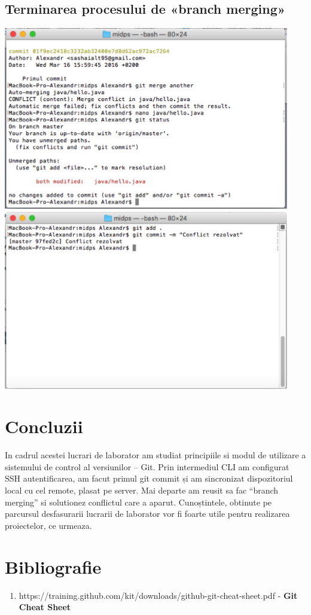 \documentclass[12pt]{article}
\begin{document}
\subsection{Terminarea procesului de «branch merging»}
\includegraphics[width=12.5cm]{images/26}\\
\includegraphics[width=12.5cm]{images/27}
\section*{Concluzii}
In cadrul acestei lucrari de laborator am studiat principiile si modul de utilizare a sistemului de control al versiunilor – Git. Prin intermediul CLI am configurat SSH autentificarea, am facut primul git commit și am sincronizat dispozitoriul local cu cel remote, plasat pe server. Mai departe am reusit sa fac “branch merging” si solutionez conflictul care a aparut. Cunoștintele, obtinute pe parcursul desfasurarii lucrarii de laborator vor fi foarte utile pentru realizarea proiectelor, ce urmeaza.
\section*{Bibliografie}
\begin{enumerate}
	\item https://training.github.com/kit/downloads/github-git-cheat-sheet.pdf - \textbf{Git Cheat Sheet}
\end{enumerate}
\end{document}
